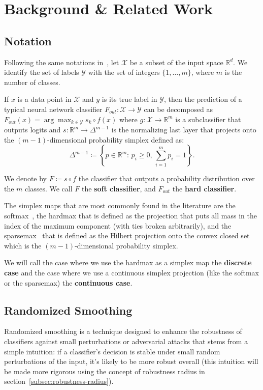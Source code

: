 \section{Background \& Related Work}\label{sec:background-&-related-work}

\subsection{Notation}\label{subsec:notation}
Following the same notations in~\citep{delattre2023lipschitz}, let $\mathcal{X}$ be a subset of the input space $\mathbb{R}^d$.
We identify the set of labels $\mathcal{Y}$ with the set of integers $\{1, \ldots, m\}$, where $m$ is the number of classes.

If $x$ is a data point in $\mathcal{X}$ and $y$ is its true label in $\mathcal{Y}$, then the prediction of a typical neural network classifier $F_{out}: \mathcal{X} \rightarrow \mathcal{Y}$ can be decomposed as $F_{out}(x)=\arg\max_{k \in \mathcal{Y}}s_k\circ f(x)$ where $g: \mathcal{X} \rightarrow \mathbb{R}^m$ is a subclassifier that outputs logits
and $s: \mathbb{R}^m \rightarrow \Delta^{m-1}$ is the normalizing last layer that projects onto the $(m-1)$-dimensional probability simplex defined as:
\[
    \Delta^{m-1} \coloneqq \left\{p \in \mathbb{R}^m : \, p_i \geq 0, \,\sum_{i=1}^m p_i = 1 \right\}.
\]

We denote by $F\coloneqq s\circ f$ the classifier that outputs a probability distribution over the $m$ classes.
We call $F$ the \textbf{soft classifier}, and $F_{out}$ the \textbf{hard classifier}.

The simplex maps that are most commonly found in the literature are the softmax~\citep{bridle1989training}, the hardmax that is defined as the projection that puts all mass in the index of the maximum component (with ties broken arbitrarily), and the sparsemax~\citep{martins16} that is defined as the Hilbert projection onto the convex closed set which is the $(m-1)$-dimensional probability simplex.

We will call the case where we use the hardmax as a simplex map the \textbf{discrete case} and the case where we use a continuous simplex projection (like the softmax or the sparsemax) the \textbf{continuous case}.

\subsection{Randomized Smoothing}\label{subsec:randomized-smoothing}
Randomized smoothing is a technique designed to enhance the robustness of classifiers against small perturbations or adversarial attacks that stems from a simple intuition: if a classifier's decision is stable under small random perturbations of the input, it's likely to be more robust overall (this intuition will be made more rigorous using the concept of robustness radius in section~\ref{subsec:robustness-radius}).

